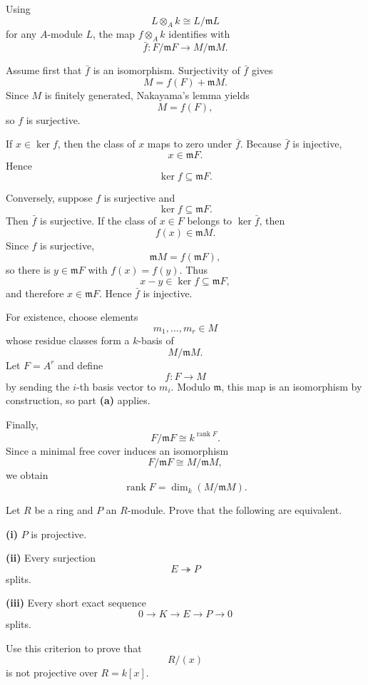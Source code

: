 \begin{solution}
Using
\[
L\otimes_A k\cong L/\mathfrak mL
\]
for any \(A\)-module \(L\), the map \(f\otimes_A k\) identifies with
\[
\bar f:F/\mathfrak mF\longrightarrow M/\mathfrak mM.
\]

Assume first that \(\bar f\) is an isomorphism. Surjectivity of \(\bar f\)
gives
\[
M=f(F)+\mathfrak mM.
\]
Since \(M\) is finitely generated, Nakayama's lemma yields
\[
M=f(F),
\]
so \(f\) is surjective.

If \(x\in\ker f\), then the class of \(x\) maps to zero under \(\bar f\).
Because \(\bar f\) is injective,
\[
x\in\mathfrak mF.
\]
Hence
\[
\ker f\subseteq\mathfrak mF.
\]

Conversely, suppose \(f\) is surjective and
\[
\ker f\subseteq\mathfrak mF.
\]
Then \(\bar f\) is surjective. If the class of \(x\in F\) belongs to
\(\ker\bar f\), then
\[
f(x)\in\mathfrak mM.
\]
Since \(f\) is surjective,
\[
\mathfrak mM=f(\mathfrak mF),
\]
so there is \(y\in\mathfrak mF\) with \(f(x)=f(y)\). Thus
\[
x-y\in\ker f\subseteq\mathfrak mF,
\]
and therefore \(x\in\mathfrak mF\). Hence \(\bar f\) is injective.

For existence, choose elements
\[
m_1,\dots,m_r\in M
\]
whose residue classes form a \(k\)-basis of
\[
M/\mathfrak mM.
\]
Let \(F=A^r\) and define
\[
f:F\to M
\]
by sending the \(i\)-th basis vector to \(m_i\). Modulo \(\mathfrak m\), this
map is an isomorphism by construction, so part \textbf{(a)} applies.

Finally,
\[
F/\mathfrak mF\cong k^{\operatorname{rank}F}.
\]
Since a minimal free cover induces an isomorphism
\[
F/\mathfrak mF\cong M/\mathfrak mM,
\]
we obtain
\[
\operatorname{rank}F
=
\dim_k(M/\mathfrak mM).
\]
\end{solution}


\begin{problem}[CP-V-0025]
\label{prob:cp-v-0025}
Let \(R\) be a ring and \(P\) an \(R\)-module. Prove that the following are
equivalent.

\textbf{(i)} \(P\) is projective.

\textbf{(ii)} Every surjection
\[
E\twoheadrightarrow P
\]
splits.

\textbf{(iii)} Every short exact sequence
\[
0\longrightarrow K\longrightarrow E\longrightarrow P\longrightarrow0
\]
splits.

Use this criterion to prove that
\[
R/(x)
\]
is not projective over \(R=k[x]\).
\end{problem}

